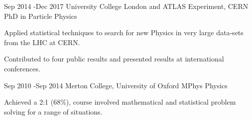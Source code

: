 \documentclass[10pt]{article} %
\begin{document}
\job
{Sep 2014 -}{Dec 2017}
{University College London and ATLAS Experiment, CERN}
{}
{PhD in Particle Physics}
{
  \begin{itemize-noindent}
  \item{Applied statistical techniques to search for new Physics in very large data-sets from the LHC at CERN.}
  \item{Contributed to four public results and presented results at international conferences.}
  \end{itemize-noindent}
}

\job
{Sep 2010 -}{Sep 2014}
{Merton College, University of Oxford}
{}
{MPhys Physics}
{
  \begin{itemize-noindent}
  \item{Achieved a 2:1 (68\%), course involved mathematical and statistical problem solving for a range of situations.}
  \end{itemize-noindent}
}
\end{document}
